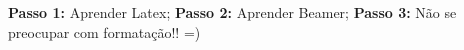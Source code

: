 \textbf{Passo 1:} Aprender Latex;
\pause
\textbf{Passo 2:} Aprender Beamer;
\pause
\textbf{Passo 3:} Não se preocupar com formatação!! =)
